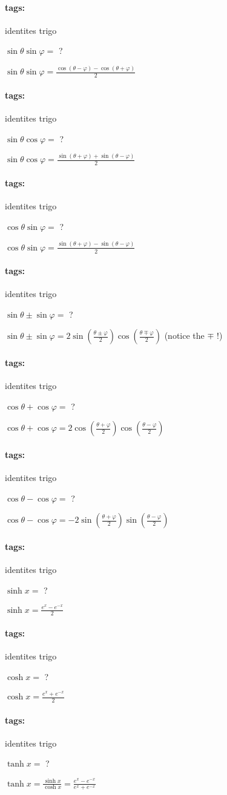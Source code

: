 \documentclass[12pt]{article}
\newcommand*{\xfield}[1]{\begin{mdframed}\centering #1\end{mdframed}\bigskip}
\newenvironment{note}{}{}
\newcommand*{\tags}[1]{\paragraph{tags: }#1}
\begin{document}
\begin{note}
	\tags{identites trigo}
    \xfield{$\sin \theta \sin \varphi =$ ?}
    \xfield{$\sin \theta \sin \varphi = \frac{\cos(\theta - \varphi) - \cos(\theta + \varphi)} {2}$}
\end{note}

\begin{note}
	\tags{identites trigo}
    \xfield{$\sin \theta \cos \varphi =$ ?}
    \xfield{$\sin \theta \cos \varphi = \frac{\sin(\theta + \varphi) + \sin(\theta - \varphi)} {2}$}
\end{note}

\begin{note}
	\tags{identites trigo}
    \xfield{$\cos \theta \sin \varphi =$ ?}
    \xfield{$\cos \theta \sin \varphi = \frac{\sin(\theta + \varphi) - \sin(\theta - \varphi)} {2}$}
\end{note}

\begin{note}
	\tags{identites trigo}
    \xfield{$\sin \theta \pm \sin \varphi =$ ?}
    \xfield{$\sin \theta \pm \sin \varphi = 2 \sin\left( \frac{\theta \pm \varphi}{2} \right) \cos\left( \frac{\theta \mp \varphi}{2} \right)$ (notice the $\mp$ !)}
\end{note}

\begin{note}
	\tags{identites trigo}
    \xfield{$\cos \theta + \cos \varphi =$ ?}
    \xfield{$\cos \theta + \cos \varphi = 2 \cos\left( \frac{\theta + \varphi} {2} \right) \cos\left( \frac{\theta - \varphi}{2} \right)$}
\end{note}

\begin{note}
	\tags{identites trigo}
    \xfield{$\cos \theta - \cos \varphi =$ ?}
    \xfield{$\cos \theta - \cos \varphi = -2\sin\left( \frac{\theta + \varphi} {2}\right) \sin\left(\frac {\theta - \varphi}{2}\right)$}
\end{note}

\begin{note}
	\tags{identites trigo}
    \xfield{$\sinh x =$ ?}
    \xfield{$\sinh x = \frac {e^x - e^{-x}} {2}$}
\end{note}

\begin{note}
	\tags{identites trigo}
    \xfield{$\cosh x = $ ?}
    \xfield{$\cosh x = \frac {e^x + e^{-x}} {2}$}
\end{note}

\begin{note}
	\tags{identites trigo}
    \xfield{$\tanh x =$ ?}
    \xfield{$\tanh x = \frac{\sinh x}{\cosh x} = \frac {e^x - e^{-x}} {e^x + e^{-x}}$}
\end{note}
\end{document}
